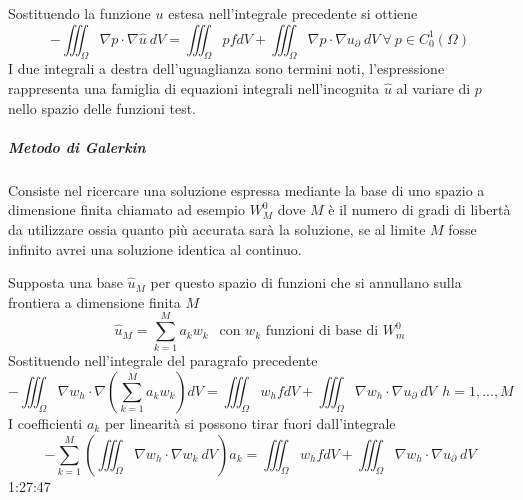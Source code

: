 Sostituendo la funzione $u$ estesa nell'integrale precedente si ottiene
$$
-\iiint_\Omega \nabla p \cdot \nabla\hat{u}\  dV = \iiint_\Omega p f dV +
\iiint_\Omega \nabla p \cdot \nabla u_\partial\ dV\ \forall\ p\in C^1_0(\Omega)
$$
I due integrali a destra dell'uguaglianza sono termini noti, l'espressione rappresenta
una famiglia di equazioni integrali nell'incognita $\hat{u}$ al variare
di $p$ nello spazio delle funzioni test.

\newpage
\subparagraph{Metodo di Galerkin}
Consiste nel ricercare una soluzione espressa mediante la base di uno spazio
a dimensione finita chiamato ad esempio $W^0_M$ dove $M$ è il numero di
gradi di libertà da utilizzare ossia quanto più accurata sarà la soluzione,
se al limite $M$ fosse infinito avrei una soluzione identica al continuo.

Supposta una base $\hat{u}_M$ per questo spazio di funzioni che si 
annullano sulla frontiera a dimensione finita $M$
$$
\hat{u}_M = \sum_{k = 1}^{M} a_k w_k \ \ \text{ con } w_k \text{ funzioni di base di } W_m^0
$$
Sostituendo nell'integrale del paragrafo precedente
$$
-\iiint_\Omega \nabla w_h \cdot \nabla \left(\sum_{k=1}^{M} a_k w_k \right) dV = 
\iiint_\Omega w_h f dV + \iiint_\Omega \nabla w_h \cdot \nabla u_\partial\ dV\ \ h=1,...,M
$$
I coefficienti $a_k$ per linearità si possono tirar fuori dall'integrale
$$
-\sum_{k=1}^M \left(\iiint_\Omega \nabla w_h \cdot \nabla w_k\ dV \right) a_k = 
\iiint_\Omega w_h f dV + \iiint_\Omega \nabla w_h \cdot \nabla u_\partial\ dV
$$
1:27:47


